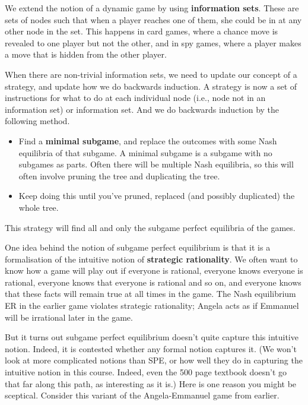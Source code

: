 We extend the notion of a dynamic game by using \textbf{information sets}. These are sets of nodes such that when a player reaches one of them, she could be in at any other node in the set. This happens in card games, where a chance move is revealed to one player but not the other, and in spy games, where a player makes a move that is hidden from the other player.

When there are non-trivial information sets, we need to update our concept of a strategy, and update how we do backwards induction. A strategy is now a set of instructions for what to do at each individual node (i.e., node not in an information set) or information set. And we do backwards induction by the following method.

\begin{itemize}
\item{} Find a \textbf{minimal subgame}, and replace the outcomes with some Nash equilibria of that subgame. A minimal subgame is a subgame with no subgames as parts. Often there will be multiple Nash equilibria, so this will often involve pruning the tree and duplicating the tree.

\item{} Keep doing this until you've pruned, replaced (and possibly duplicated) the whole tree.

\end{itemize}

This strategy will find all and only the subgame perfect equilibria of the games.

One idea behind the notion of subgame perfect equilibrium is that it is a formalisation of the intuitive notion of \textbf{strategic rationality}. We often want to know how a game will play out if everyone is rational, everyone knows everyone is rational, everyone knows that everyone is rational and so on, and everyone knows that these facts will remain true at all times in the game. The Nash equilibrium ER in the earlier game violates strategic rationality; Angela acts as if Emmanuel will be irrational later in the game.

But it turns out subgame perfect equilibrium doesn't quite capture this intuitive notion. Indeed, it is contested whether any formal notion captures it. (We won't look at more complicated notions than SPE, or how well they do in capturing the intuitive notion in this course. Indeed, even the 500 page textbook doesn't go that far along this path, as interesting as it is.) Here is one reason you might be sceptical. Consider this variant of the Angela-Emmanuel game from earlier.


